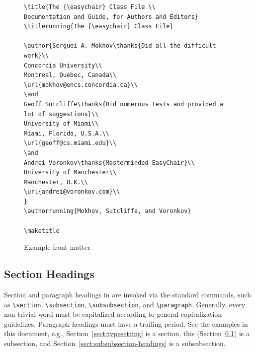 \documentclass{easychair}
\newcommand{\easychair}{\sf{easychair}}
\begin{document}
\begin{figure}
\small
\begin{verbatim}
\title{The {\easychair} Class File \\
Documentation and Guide, for Authors and Editors}
\titlerunning{The {\easychair} Class File}

\author{Serguei A. Mokhov\thanks{Did all the difficult work}\\
Concordia University\\
Montreal, Quebec, Canada\\
\url{mokhov@encs.concordia.ca}\\
\and
Geoff Sutcliffe\thanks{Did numerous tests and provided a lot of suggestions}\\
University of Miami\\
Miami, Florida, U.S.A.\\
\url{geoff@cs.miami.edu}\\
\and
Andrei Voronkov\thanks{Masterminded EasyChair}\\
University of Manchester\\
Manchester, U.K.\\
\url{andrei@voronkov.com}\\
}
\authorrunning{Mokhov, Sutcliffe, and Voronkov}

\maketitle
\end{verbatim}
\normalsize
\caption{Example front matter}
\label{fig:author-example}
\end{figure}

\subsection{Section Headings}
\label{sect:section-headings}

Section and paragraph headings in {\easychair} are invoked via the standard 
commands, such as
\verb+\section+,
\verb+\subsection+,
\verb+\subsubsection+, and
\verb+\paragraph+.
Generally, every non-trivial word must be capitalized according to 
general capitalization guidelines. 
Paragraph headings must have a trailing period.
See the examples in this document, e.g., Section~\ref{sect:typesetting} is a
section, this (Section~\ref{sect:section-headings}) is a subsection, and 
Section~\ref{sect:subsubsection-headings} is a subsubsection.
\end{document}
